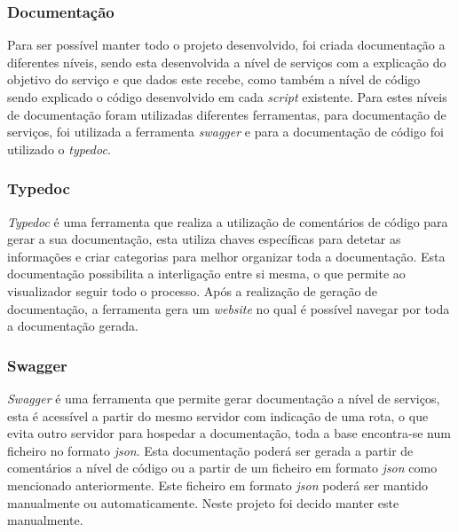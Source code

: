 \subsubsection{Documentação}
Para ser possível manter todo o projeto desenvolvido, foi criada documentação a diferentes níveis, sendo esta desenvolvida a nível de serviços com a explicação do objetivo do serviço e que dados este recebe, como também a nível de código sendo explicado o código desenvolvido em cada \textit{script} existente. Para estes níveis de documentação foram utilizadas diferentes ferramentas, para documentação de serviços, foi utilizada a ferramenta \textit{swagger} e para a documentação de código foi utilizado o \textit{typedoc}.

\subsubsection{Typedoc}
\textit{Typedoc} é uma ferramenta que realiza a utilização de comentários de código para gerar a sua documentação, esta utiliza chaves específicas para detetar as informações e criar categorias para melhor organizar toda a documentação. Esta documentação possibilita a interligação entre si mesma, o que permite ao visualizador seguir todo o processo. Após a realização de geração de documentação, a ferramenta gera um \textit{website} no qual é possível navegar por toda a documentação gerada.

\newpage

\subsubsection{Swagger}
\textit{Swagger} é uma ferramenta que permite gerar documentação a nível de serviços, esta é acessível a partir do mesmo servidor com indicação de uma rota, o que evita outro servidor para hospedar a documentação, toda a base encontra-se num ficheiro no formato \textit{json}. Esta documentação poderá ser gerada a partir de comentários a nível de código ou a partir de um ficheiro em formato \textit{json} como mencionado anteriormente. Este ficheiro em formato \textit{json} poderá ser mantido manualmente ou automaticamente. Neste projeto foi decido manter este manualmente.